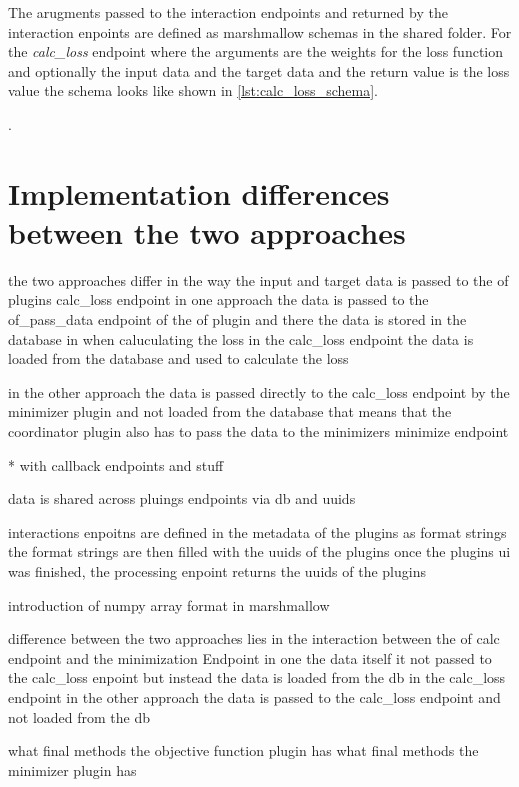 \documentclass[
  a4paper,  %
  twoside,  %
  bibliography=totoc,
  headsepline,
  cleardoublepage=empty,
  parskip=half,
  draft=false
]{scrbook}
\begin{document}
The arugments passed to the interaction endpoints and returned by the interaction enpoints are defined as marshmallow schemas in the shared folder.
For the \emph{calc\_loss} endpoint where the arguments are the weights for the loss function and optionally the input data and the target data and the return value is the loss value the schema looks like shown in \ref{lst:calc_loss_schema}.

.

\section{Implementation differences between the two approaches}
the two approaches differ in the way the input and target data is passed to the of plugins calc\_loss endpoint
in one approach the data is passed to the of\_pass\_data endpoint of the \gls{of} plugin and there the data is stored in the database
in when caluculating the loss in the calc\_loss endpoint the data is loaded from the database and used to calculate the loss

in the other approach the data is passed directly to the calc\_loss endpoint by the minimizer plugin and not loaded from the database
that means that the coordinator plugin also has to pass the data to the minimizers minimize endpoint


* with callback endpoints and stuff

data is shared across pluings endpoints via db and uuids

interactions enpoitns are defined in the metadata of the plugins as format strings
the format strings are then filled with the uuids of the plugins once the plugins ui was finished, the processing enpoint returns the uuids of the plugins

introduction of numpy array format in marshmallow

difference between the two approaches lies in the interaction between the of calc endpoint and the minimization Endpoint
in one the data itself it not passed to the calc\_loss enpoint but instead the data is loaded from the db in the calc\_loss endpoint
in the other approach the data is passed to the calc\_loss endpoint and not loaded from the db

what final methods the objective function plugin has
what final methods the minimizer plugin has
\end{document}
